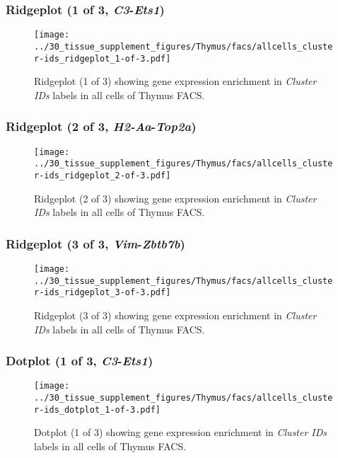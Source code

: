 \clearpage

\subsubsection{Ridgeplot (1 of 3, \emph{C3}-\emph{Ets1})}
\begin{figure}[h]
\centering
\texttt{[image: ../30\_tissue\_supplement\_figures/Thymus/facs/allcells\_cluster-ids\_ridgeplot\_1-of-3.pdf]}

\caption{ Ridgeplot (1 of 3)  showing gene expression enrichment in \emph{Cluster IDs} labels in all cells of Thymus FACS. }
\end{figure}


\clearpage

\subsubsection{Ridgeplot (2 of 3, \emph{H2-Aa}-\emph{Top2a})}
\begin{figure}[h]
\centering
\texttt{[image: ../30\_tissue\_supplement\_figures/Thymus/facs/allcells\_cluster-ids\_ridgeplot\_2-of-3.pdf]}

\caption{ Ridgeplot (2 of 3)  showing gene expression enrichment in \emph{Cluster IDs} labels in all cells of Thymus FACS. }
\end{figure}


\clearpage

\subsubsection{Ridgeplot (3 of 3, \emph{Vim}-\emph{Zbtb7b})}
\begin{figure}[h]
\centering
\texttt{[image: ../30\_tissue\_supplement\_figures/Thymus/facs/allcells\_cluster-ids\_ridgeplot\_3-of-3.pdf]}

\caption{ Ridgeplot (3 of 3)  showing gene expression enrichment in \emph{Cluster IDs} labels in all cells of Thymus FACS. }
\end{figure}


\clearpage

\subsubsection{Dotplot (1 of 3, \emph{C3}-\emph{Ets1})}
\begin{figure}[h]
\centering
\texttt{[image: ../30\_tissue\_supplement\_figures/Thymus/facs/allcells\_cluster-ids\_dotplot\_1-of-3.pdf]}

\caption{ Dotplot (1 of 3)  showing gene expression enrichment in \emph{Cluster IDs} labels in all cells of Thymus FACS. }
\end{figure}


